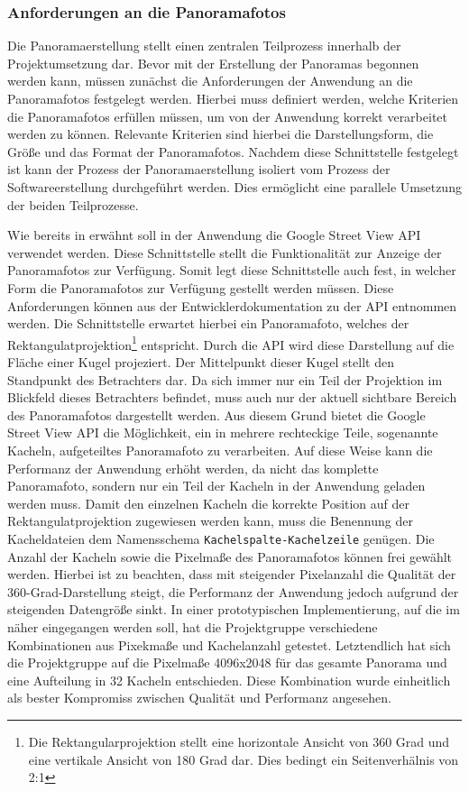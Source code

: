 \subsubsection{Anforderungen an die Panoramafotos}
\label{sec:PanoramaerstellungAnforderungen}

Die Panoramaerstellung stellt einen zentralen Teilprozess innerhalb der
Projektumsetzung dar. Bevor mit der Erstellung der Panoramas begonnen werden
kann, müssen zunächst die Anforderungen der Anwendung an die Panoramafotos
festgelegt werden. Hierbei muss definiert werden, welche Kriterien die
Panoramafotos erfüllen müssen, um von der Anwendung korrekt verarbeitet werden
zu können. Relevante Kriterien sind hierbei die Darstellungsform, die Größe und
das Format der Panoramafotos. Nachdem diese Schnittstelle festgelegt ist kann
der Prozess der Panoramaerstellung isoliert vom Prozess der Softwareerstellung
durchgeführt werden. Dies ermöglicht eine parallele Umsetzung der beiden
Teilprozesse.

Wie bereits in  erwähnt soll in der Anwendung die Google
Street View API verwendet werden. Diese Schnittstelle stellt die Funktionalität
zur Anzeige der Panoramafotos zur Verfügung. Somit legt diese Schnittstelle auch
fest, in welcher Form die Panoramafotos zur Verfügung gestellt werden müssen.
Diese Anforderungen können aus der Entwicklerdokumentation zu der API entnommen
werden. Die Schnittstelle erwartet hierbei ein Panoramafoto, welches der
Rektangulatprojektion\footnote{Die Rektangularprojektion stellt eine
horizontale Ansicht von 360 Grad und eine vertikale Ansicht von 180 Grad dar.
Dies bedingt ein Seitenverhälnis von 2:1} entspricht. Durch die API wird diese
Darstellung auf die Fläche einer Kugel projeziert. Der Mittelpunkt dieser Kugel
stellt den Standpunkt des Betrachters dar. Da sich immer nur ein Teil der
Projektion im Blickfeld dieses Betrachters befindet, muss auch nur der aktuell
sichtbare Bereich des Panoramafotos dargestellt werden. Aus diesem Grund bietet
die Google Street View API die Möglichkeit, ein in mehrere rechteckige Teile,
sogenannte Kacheln, aufgeteiltes Panoramafoto zu verarbeiten. Auf diese Weise
kann die Performanz der Anwendung erhöht werden, da nicht das komplette
Panoramafoto, sondern nur ein Teil der Kacheln in der Anwendung geladen werden
muss. Damit den einzelnen Kacheln die korrekte Position auf der
Rektangulatprojektion zugewiesen werden kann, muss die Benennung der
Kacheldateien dem Namensschema \texttt{Kachelspalte-Kachelzeile} genügen. Die
Anzahl der Kacheln sowie die Pixelmaße des Panoramafotos können frei gewählt
werden. Hierbei ist zu beachten, dass mit steigender Pixelanzahl die Qualität
der 360-Grad-Darstellung steigt, die Performanz der Anwendung jedoch aufgrund
der steigenden Datengröße sinkt. In einer prototypischen Implementierung, auf
die im  näher eingegangen werden soll, hat die
Projektgruppe verschiedene Kombinationen aus Pixekmaße und Kachelanzahl
getestet. Letztendlich hat sich die Projektgruppe auf die Pixelmaße 4096x2048
für das gesamte Panorama und eine Aufteilung in 32 Kacheln entschieden. Diese
Kombination wurde einheitlich als bester Kompromiss zwischen Qualität und
Performanz angesehen.